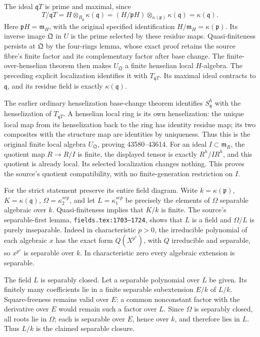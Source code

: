 The ideal \(\mathfrak qT\) is prime and maximal, since \[
 T/\mathfrak qT
 =H\otimes_{R_{\mathfrak p}}\kappa(\mathfrak q)
 =(H/\mathfrak pH)\otimes_{\kappa(\mathfrak p)}\kappa(\mathfrak q)
 =\kappa(\mathfrak q).
\] Here \(\mathfrak pH=\mathfrak m_H\), with the original specified identification \(H/\mathfrak m_H=\kappa(\mathfrak p)\). Its inverse image \(\mathfrak Q\) in \(U\) is the prime selected by these residue maps. Quasi-finiteness persists at \(\mathfrak Q\) by the four-rings lemma, whose exact proof retains the source fibre's finite factor and its complementary factor after base change. The finite-over-henselian theorem then makes \(U_{\mathfrak Q}\) a finite henselian local \(H\)-algebra. The preceding explicit localization identifies it with \(T_{\mathfrak qT}\). Its maximal ideal contracts to \(\mathfrak q\), and its residue field is exactly \(\kappa(\mathfrak q)\).

The earlier ordinary henselization base-change theorem identifies \(S_{\mathfrak q}^h\) with the henselization of \(T_{\mathfrak qT}\). A henselian local ring is its own henselization: the unique local map from its henselization back to the ring has identity residue map; its two composites with the structure map are identities by uniqueness. Thus this is the original finite local algebra \(U_{\mathfrak Q}\), proving 43580--43614. For an ideal \(I\subset\mathfrak m_R\), the quotient map \(R\to R/I\) is finite, the displayed tensor is exactly \(R^h/IR^h\), and this quotient is already local. Its selected localization changes nothing. This proves the source's quotient compatibility, with no finite-generation restriction on \(I\).

For the strict statement preserve its entire field diagram. Write \(k=\kappa(\mathfrak p)\), \(K=\kappa(\mathfrak q)\), \(\Omega=\kappa_2^{sep}\), and let \(L=\kappa_1^{sep}\) be precisely the elements of \(\Omega\) separable algebraic over \(k\). Quasi-finiteness implies that \(K/k\) is finite. The source's separable-first lemma, \texttt{fields.\AlgebraIdentifierBreak{}tex:\AlgebraIdentifierBreak{}1703–\AlgebraIdentifierBreak{}1724}, shows that \(L\) is a field and \(\Omega/L\) is purely inseparable. Indeed in characteristic \(p>0\), the irreducible polynomial of each algebraic \(x\) has the exact form \(Q(X^{p^e})\), with \(Q\) irreducible and separable, so \(x^{p^e}\) is separable over \(k\). In characteristic zero every algebraic extension is separable.

The field \(L\) is separably closed. Let a separable polynomial over \(L\) be given. Its finitely many coefficients lie in a finite separable subextension \(E/k\) of \(L/k\). Square-freeness remains valid over \(E\): a common nonconstant factor with the derivative over \(E\) would remain such a factor over \(L\). Since \(\Omega\) is separably closed, all roots lie in \(\Omega\); each is separable over \(E\), hence over \(k\), and therefore lies in \(L\). Thus \(L/k\) is the claimed separable closure.

